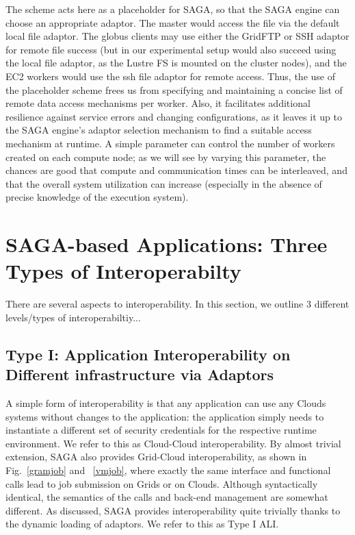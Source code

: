 \documentclass[3p,twocolumn]{elsarticle}
\begin{document}
The scheme  acts here as a placeholder for SAGA, so that the
SAGA engine can choose an appropriate adaptor.  The master would
access the file via the default local file adaptor.  The globus
clients may use either the GridFTP or SSH adaptor for remote file
success (but in our experimental setup would also succeed 
using the local file adaptor, as the Lustre FS is mounted on the
cluster nodes), and the EC2 workers would use the ssh file adaptor for
remote access.  Thus, the use of the placeholder scheme frees us from
specifying and maintaining a concise list of remote data access
mechanisms per worker.  Also, it facilitates additional resilience
against service errors and changing configurations, as it leaves it up
to the SAGA engine's adaptor selection mechanism to find a suitable
access mechanism at runtime.
A simple parameter can control the number of workers created on each
compute node; as we will see by varying this parameter, the chances
are good that compute and communication times can be interleaved, and
that the overall system utilization can increase (especially in the
absence of precise knowledge of the execution system).
 


\section{SAGA-based Applications: Three Types of Interoperabilty}

There are several aspects to interoperability. In this section, we
outline
3 different levels/types of interoperabiltiy...


\subsection{Type I: Application Interoperability on Different
  infrastructure via Adaptors}

A simple form of interoperability is that any application can use any
Clouds systems without changes to the application: the application
simply needs to instantiate a different set of security credentials
for the respective runtime environment. We refer to this as
Cloud-Cloud interoperability. By almost trivial extension, SAGA also
provides Grid-Cloud interoperability, as shown in Fig.~\ref{gramjob}
and ~\ref{vmjob}, where exactly the same interface and functional
calls lead to job submission on Grids or on Clouds. Although
syntactically identical, the semantics of the calls and back-end
management are somewhat different.  As discussed, SAGA provides
interoperability quite trivially thanks to the dynamic loading of
adaptors.  We refer to this as Type I ALI.
\end{document}
